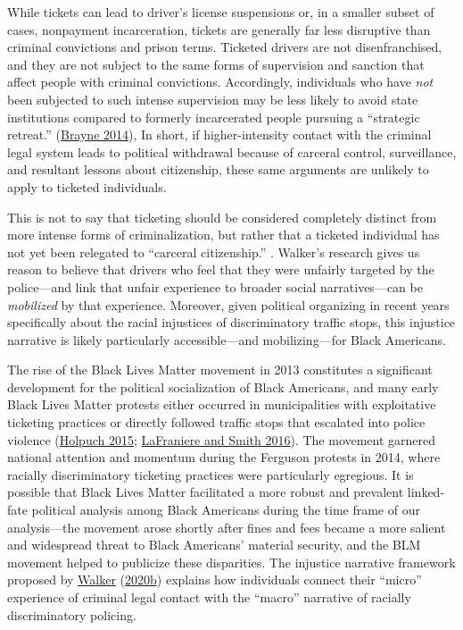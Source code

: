 \documentclass[
  12pt,
]{article}
\begin{document}
While tickets can lead to driver's license suspensions or, in a smaller subset of cases, nonpayment incarceration, tickets are generally far less disruptive than criminal convictions and prison terms. Ticketed drivers are not disenfranchised, and they are not subject to the same forms of supervision and sanction that affect people with criminal convictions. Accordingly, individuals who have \emph{not} been subjected to such intense supervision may be less likely to avoid state institutions compared to formerly incarcerated people pursuing a ``strategic retreat.'' (\protect\hyperlink{ref-Brayne2014}{Brayne 2014}), In short, if higher-intensity contact with the criminal legal system leads to political withdrawal because of carceral control, surveillance, and resultant lessons about citizenship, these same arguments are unlikely to apply to ticketed individuals.

This is not to say that ticketing should be considered completely distinct from more intense forms of criminalization, but rather that a ticketed individual has not yet been relegated to ``carceral citizenship.'' . Walker's research gives us reason to believe that drivers who feel that they were unfairly targeted by the police---and link that unfair experience to broader social narratives---can be \emph{mobilized} by that experience. Moreover, given political organizing in recent years specifically about the racial injustices of discriminatory traffic stops, this injustice narrative is likely particularly accessible---and mobilizing---for Black Americans.

The rise of the Black Lives Matter movement in 2013 constitutes a significant development for the political socialization of Black Americans, and many early Black Lives Matter protests either occurred in municipalities with exploitative ticketing practices or directly followed traffic stops that escalated into police violence (\protect\hyperlink{ref-Holpuch2015}{Holpuch 2015}; \protect\hyperlink{ref-LaFraniere2016}{LaFraniere and Smith 2016}). The movement garnered national attention and momentum during the Ferguson protests in 2014, where racially discriminatory ticketing practices were particularly egregious. It is possible that Black Lives Matter facilitated a more robust and prevalent linked-fate political analysis among Black Americans during the time frame of our analysis---the movement arose shortly after fines and fees became a more salient and widespread threat to Black Americans' material security, and the BLM movement helped to publicize these disparities. The injustice narrative framework proposed by \protect\hyperlink{ref-Walker2020a}{Walker} (\protect\hyperlink{ref-Walker2020a}{2020b}) explains how individuals connect their ``micro'' experience of criminal legal contact with the ``macro'' narrative of racially discriminatory policing.
\end{document}
